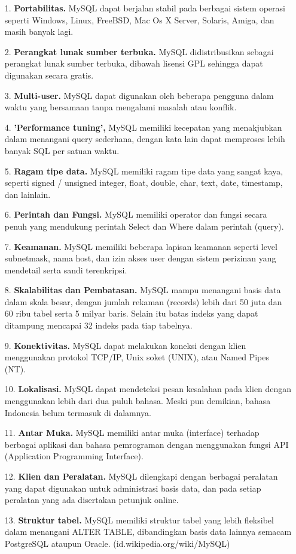 \documentclass{jtetiproposalskripsi}
\begin{document}
\begin{itemize}
\item[1.] \textbf{Portabilitas.} MySQL dapat berjalan stabil pada berbagai sistem operasi seperti Windows, Linux, FreeBSD, Mac Os X Server, Solaris, Amiga, dan masih banyak lagi.
\item[2.] \textbf{Perangkat lunak sumber terbuka.} MySQL didistribusikan sebagai perangkat lunak sumber terbuka, dibawah lisensi GPL sehingga dapat digunakan secara gratis.
\item[3.]\textbf{ Multi-user.} MySQL dapat digunakan oleh beberapa pengguna dalam waktu yang bersamaan tanpa mengalami masalah atau konflik.
\item[4.]\textbf{ 'Performance tuning',} MySQL memiliki kecepatan yang menakjubkan dalam menangani query sederhana, dengan kata lain dapat memproses lebih banyak SQL per satuan waktu.
\item[5.]\textbf{ Ragam tipe data.} MySQL memiliki ragam tipe data yang sangat kaya, seperti signed / unsigned integer, float, double, char, text, date, timestamp, dan lainlain.
\item[6.]\textbf{ Perintah dan Fungsi.} MySQL memiliki operator dan fungsi secara penuh yang mendukung perintah Select dan Where dalam perintah (query).
\item[7.]\textbf{ Keamanan.} MySQL memiliki beberapa lapisan keamanan seperti level subnetmask, nama host, dan izin akses user dengan sistem perizinan yang mendetail serta sandi terenkripsi.
\item[8.]\textbf{ Skalabilitas dan Pembatasan.} MySQL mampu menangani basis data dalam skala besar, dengan jumlah rekaman (records) lebih dari 50 juta dan 60 ribu tabel serta 5 milyar baris. Selain itu batas indeks yang dapat ditampung mencapai 32 indeks pada tiap tabelnya.
\item[9.]\textbf{ Konektivitas.} MySQL dapat melakukan koneksi dengan klien menggunakan protokol TCP/IP, Unix soket (UNIX), atau Named Pipes (NT).
\item[10.]\textbf{ Lokalisasi.} MySQL dapat mendeteksi pesan kesalahan pada klien dengan menggunakan lebih dari dua puluh bahasa. Meski pun demikian, bahasa Indonesia belum termasuk di dalamnya.
\item[11.]\textbf{ Antar Muka.} MySQL memiliki antar muka (interface) terhadap berbagai aplikasi dan bahasa pemrograman dengan menggunakan fungsi API (Application Programming Interface). 
\item[12.]\textbf{ Klien dan Peralatan.} MySQL dilengkapi dengan berbagai peralatan yang dapat digunakan untuk administrasi basis data, dan pada setiap peralatan yang ada disertakan petunjuk online.
\item[13.]\textbf{ Struktur tabel.} MySQL memiliki struktur tabel yang lebih fleksibel dalam menangani ALTER TABLE, dibandingkan basis data lainnya semacam PostgreSQL ataupun Oracle. (id.wikipedia.org/wiki/MySQL)
\end{itemize}
\end{document}
